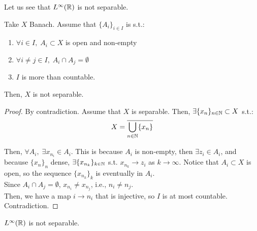 \vspace{1em}

\begin{note}
    Let us see that $L^{\infty}(\mathbb{R})$ is not separable.\\
\end{note}

\begin{flemma}
    Take $X$ Banach. Assume that $\{A_i\}_{i \in I}$ is s.t.:
    \vspace{1em}
    \begin{enumerate}[label=(\alph*)]
        \item $\forall i \in I, \; A_i \subset X$ is open and non-empty
        \vspace{1em}
        \item $\forall i \neq j \in I, \; A_i \cap A_j = \emptyset$
        \vspace{1em}
        \item $I$ is more than countable.
    \end{enumerate}
    \vspace{1em}

    Then, $X$ is not separable.
\end{flemma}

\begin{proof}
    By contradiction. Assume that $X$ is separable. Then, $\exists \{x_n\}_{n \in \mathbb{N}} \subset X$ s.t.:
    $$X = \overline{\bigcup_{n \in \mathbb{N}} \{x_n\}}$$

    Then, $\forall A_i, \; \exists x_{n_i} \in A_i$. 
    This is because $A_i$ is non-empty, then $\exists z_i \in A_i$, and 
    because $\{x_n\}_n$ dense, $\exists \{x_{n_k}\}_{k \in \mathbb{N}}$ s.t. $x_{n_k} \to z_i$ as $k \to \infty$.
    Notice that $A_i \subset X$ is open, so the sequence $\{x_{n_k}\}_k$ is eventually in $A_i$.\\
    
    Since $A_i \cap A_j = \emptyset$,
    $x_{n_i} \neq x_{n_j}$, i.e., $n_i \neq n_j$.\\

    Then, we have a map $i \to n_i$ that is injective, so $I$ is at most countable. Contradiction.

\end{proof}

\begin{ftheorem}
    $L^{\infty}(\mathbb{R})$ is not separable.
\end{ftheorem}

